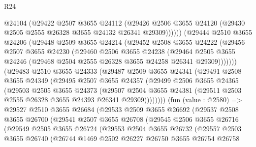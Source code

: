 \begin{lexlean}{R24}
\begin{coremodule}
              @24104
              (@29422
                @2507
                @3655
                @24112
                (@29426
                  @2506
                  @3655
                  @24120
                  (@29430 @2505 @2555 @26328 @3655 @24132 @26341 @29309))))))
        (@29444
          @2510
          @3655
          @24206
          (@29448
            @2509
            @3655
            @24214
            (@29452
              @2508
              @3655
              @24222
              (@29456
                @2507
                @3655
                @24230
                (@29460
                  @2506
                  @3655
                  @24238
                  (@29464
                    @2505
                    @3655
                    @24246
                    (@29468 @2504 @2555 @26328 @3655 @24258 @26341 @29309)))))))
        (@29483
          @2510
          @3655
          @24333
          (@29487
            @2509
            @3655
            @24341
            (@29491
              @2508
              @3655
              @24349
              (@29495
                @2507
                @3655
                @24357
                (@29499
                  @2506
                  @3655
                  @24365
                  (@29503
                    @2505
                    @3655
                    @24373
                    (@29507
                      @2504
                      @3655
                      @24381
                      (@29511 @2503 @2555 @26328 @3655 @24393 @26341 @29309))))))))
        (fun (value : @2580) =>
        @29527
          @2510
          @3655
          @26684
          (@29533
            @2509
            @3655
            @26692
            (@29537
              @2508
              @3655
              @26700
              (@29541
                @2507
                @3655
                @26708
                (@29545
                  @2506
                  @3655
                  @26716
                  (@29549
                    @2505
                    @3655
                    @26724
                    (@29553
                      @2504
                      @3655
                      @26732
                      (@29557
                        @2503
                        @3655
                        @26740
                        (@26744
                          @1469
                          @2502
                          @26227
                          @26750
                          @3655
                          @26754
                          @26758

\end{coremodule}
\end{lexlean}

